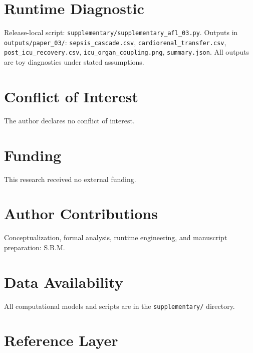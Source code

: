 \documentclass[11pt]{article}
\begin{document}
\section{Runtime Diagnostic}

Release-local script: \texttt{supplementary/supplementary\_afl\_03.py}. Outputs in \texttt{outputs/paper\_03/}: \texttt{sepsis\_cascade.csv}, \texttt{cardiorenal\_transfer.csv}, \texttt{post\_icu\_recovery.csv}, \texttt{icu\_organ\_coupling.png}, \texttt{summary.json}. All outputs are toy diagnostics under stated assumptions.

\section*{Conflict of Interest} The author declares no conflict of interest.
\section*{Funding} This research received no external funding.
\section*{Author Contributions} Conceptualization, formal analysis, runtime engineering, and manuscript preparation: S.B.M.
\section*{Data Availability} All computational models and scripts are in the \texttt{supplementary/} directory.

\section{Reference Layer}


\end{document}
